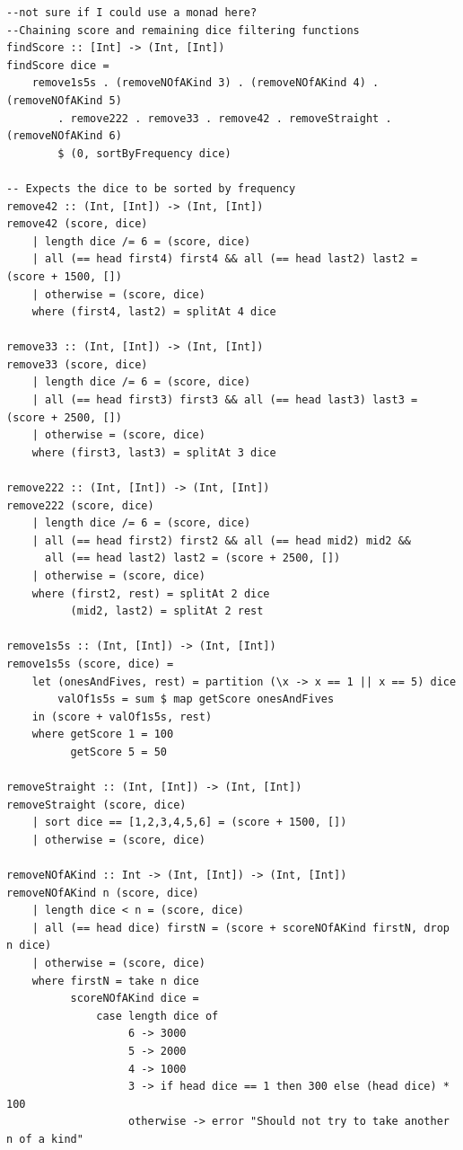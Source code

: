 \documentclass{article}
\begin{document}
\begin{lstlisting}
--not sure if I could use a monad here?
--Chaining score and remaining dice filtering functions
findScore :: [Int] -> (Int, [Int])
findScore dice =
    remove1s5s . (removeNOfAKind 3) . (removeNOfAKind 4) . (removeNOfAKind 5)
        . remove222 . remove33 . remove42 . removeStraight . (removeNOfAKind 6)
        $ (0, sortByFrequency dice) 

-- Expects the dice to be sorted by frequency
remove42 :: (Int, [Int]) -> (Int, [Int])
remove42 (score, dice)
    | length dice /= 6 = (score, dice)
    | all (== head first4) first4 && all (== head last2) last2 = (score + 1500, [])
    | otherwise = (score, dice)
    where (first4, last2) = splitAt 4 dice

remove33 :: (Int, [Int]) -> (Int, [Int])
remove33 (score, dice)
    | length dice /= 6 = (score, dice)
    | all (== head first3) first3 && all (== head last3) last3 = (score + 2500, [])
    | otherwise = (score, dice)
    where (first3, last3) = splitAt 3 dice

remove222 :: (Int, [Int]) -> (Int, [Int])
remove222 (score, dice)
    | length dice /= 6 = (score, dice)
    | all (== head first2) first2 && all (== head mid2) mid2 &&
      all (== head last2) last2 = (score + 2500, [])
    | otherwise = (score, dice)
    where (first2, rest) = splitAt 2 dice
          (mid2, last2) = splitAt 2 rest

remove1s5s :: (Int, [Int]) -> (Int, [Int])
remove1s5s (score, dice) =
    let (onesAndFives, rest) = partition (\x -> x == 1 || x == 5) dice
        valOf1s5s = sum $ map getScore onesAndFives
    in (score + valOf1s5s, rest)
    where getScore 1 = 100
          getScore 5 = 50

removeStraight :: (Int, [Int]) -> (Int, [Int])
removeStraight (score, dice)
    | sort dice == [1,2,3,4,5,6] = (score + 1500, [])
    | otherwise = (score, dice)

removeNOfAKind :: Int -> (Int, [Int]) -> (Int, [Int])
removeNOfAKind n (score, dice)
    | length dice < n = (score, dice)
    | all (== head dice) firstN = (score + scoreNOfAKind firstN, drop n dice)
    | otherwise = (score, dice)
    where firstN = take n dice
          scoreNOfAKind dice =
              case length dice of 
                   6 -> 3000
                   5 -> 2000
                   4 -> 1000
                   3 -> if head dice == 1 then 300 else (head dice) * 100
                   otherwise -> error "Should not try to take another n of a kind"
\end{lstlisting}
\end{document}
